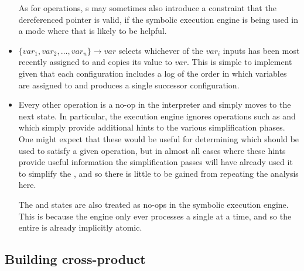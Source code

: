 \begin{itemize}
  As for  operations, s may sometimes also
  introduce a constraint that the dereferenced pointer is valid, if
  the symbolic execution engine is being used in a mode where that is
  likely to be helpful.

\item \state{$\Phi$} $\{var_1,var_2,\ldots{},var_n\} \rightarrow var$
  selects whichever of the $var_i$ inputs has been most recently
  assigned to and copies its value to $var$.  This is simple to
  implement given that each configuration includes a log of the order
  in which variables are assigned to and produces a single successor
  configuration.

\item
  Every other operation is a no-op in the interpreter and simply moves
  to the next state.  In particular, the execution engine ignores
  operations such as  and  which
  simply provide additional hints to the various \StateMachine
  simplification phases.  One might expect that these would be useful
  for determining which  should be used to satisfy a
  given  operation, but in almost all cases where these
  hints provide useful information the {\StateMachine} simplification
  passes will have already used it to simplify the {\StateMachine},
  and so there is little to be gained from repeating the analysis
  here.

  The  and  states are also
  treated as no-ops in the symbolic execution engine.  This is because
  the engine only ever processes a single {\StateMachine} at a time,
  and so the entire {\StateMachine} is already implicitly atomic.

\end{itemize}



\subsection{Building cross-product {\StateMachines}}

